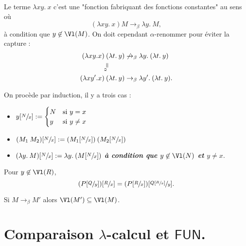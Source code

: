 \documentclass[./main]{subfiles}
\begin{document}
  \begin{exm}
    Le terme $\lambda xy. \: x$ c'est une "fonction fabriquant des fonctions constantes" au sens où  \[
      (\lambda x y. \: x) M \to_\beta \lambda y.\: M
    ,\] 
    à condition que $y \not\in \Vl(M)$.
    On doit cependant  $\alpha$-renommer pour éviter la capture :
    \begin{align*}
      (\lambda x y. x) &\: ( \lambda t. \: y) \not\to_\beta \lambda y.\: (\lambda t.\: y)\\
                       &\vertical{=_\alpha}\\
      (\lambda x y'. x) &\: ( \lambda t. \: y) \to_\beta \lambda y'.\: (\lambda t.\: y)
    .\end{align*}
  \end{exm}

  \begin{defn}
    On procède par induction, il y a trois cas :
    \begin{itemize}
      \item $y[\sfrac{N}{x}] := \begin{cases}
          N &\text{si } y = x\\
          y &\text{si } y \neq x
      \end{cases}$
    \item $(M_1 \: M_2)[\sfrac{N}{x}] := (M_1[\sfrac{N}{x}]) \: (M_2[\sfrac{N}{x}])$
    \item $(\lambda y. \: M)[\sfrac{N}{x}] := \lambda y. \: (M[\sfrac{N}{x}])$  \textit{\textbf{à condition que $y \not\in \Vl(N)$ et $y \neq x$}}.
    \end{itemize}
  \end{defn}

  \begin{lem}
    Pour $y \not\in \Vl(R)$, \[
      (P[\sfrac{Q}{y}])[\sfrac{R}{x}] =
      (P[\sfrac{R}{x}])[\sfrac{Q[\sfrac{R}{x}]}{y}]
    .\] 
  \end{lem}

  \begin{lem}
    Si $M \to_\beta M'$ alors $\Vl(M') \subseteq \Vl(M)$.
  \end{lem}

  \section{Comparaison $\lambda$-calcul et $\mathsf{FUN}$.}
\end{document}
